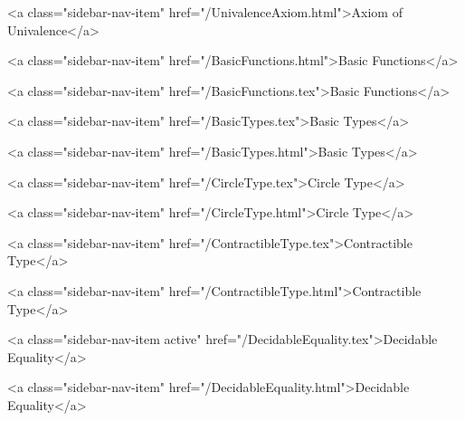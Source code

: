           <a class="sidebar-nav-item" href="/UnivalenceAxiom.html">Axiom of Univalence</a>
        
      
    
      
        
          <a class="sidebar-nav-item" href="/BasicFunctions.html">Basic Functions</a>
        
      
    
      
        
          <a class="sidebar-nav-item" href="/BasicFunctions.tex">Basic Functions</a>
        
      
    
      
        
          <a class="sidebar-nav-item" href="/BasicTypes.tex">Basic Types</a>
        
      
    
      
        
          <a class="sidebar-nav-item" href="/BasicTypes.html">Basic Types</a>
        
      
    
      
        
          <a class="sidebar-nav-item" href="/CircleType.tex">Circle Type</a>
        
      
    
      
        
          <a class="sidebar-nav-item" href="/CircleType.html">Circle Type</a>
        
      
    
      
        
          <a class="sidebar-nav-item" href="/ContractibleType.tex">Contractible Type</a>
        
      
    
      
        
          <a class="sidebar-nav-item" href="/ContractibleType.html">Contractible Type</a>
        
      
    
      
        
          <a class="sidebar-nav-item active" href="/DecidableEquality.tex">Decidable Equality</a>
        
      
    
      
        
          <a class="sidebar-nav-item" href="/DecidableEquality.html">Decidable Equality</a>
        
      
    

